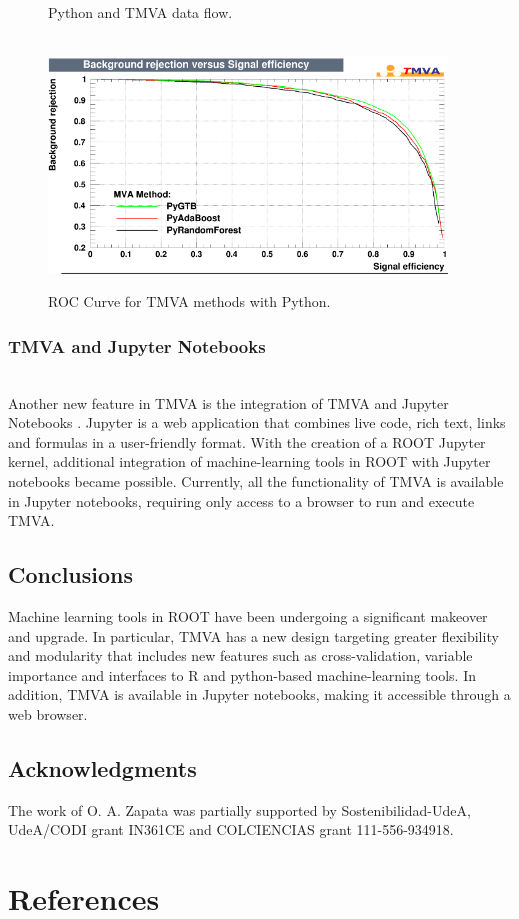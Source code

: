 \documentclass[a4paper]{jpconf}
\begin{document}
\begin{figure}[h]
\begin{minipage}{15pc}
\vspace{6pc}%
\caption{\label{pymvadf}Python and TMVA data flow.                                 }
\end{minipage}\hspace{2pc}%
\vspace{2pc}
\hspace*{\fill} \\
\includegraphics[width=25pc]{img/pymvaroc.png}\caption{\label{pymvaroc} ROC Curve for TMVA methods with Python.}
\end{figure}


\subsubsection{TMVA and Jupyter Notebooks}\hspace*{\fill} \\
Another new feature in TMVA is the integration of TMVA and Jupyter Notebooks \cite{PER-GRA:2007}. Jupyter is a web application that combines live code, rich text, links and formulas in a user-friendly format. With the creation of a ROOT Jupyter kernel, additional integration of machine-learning tools in ROOT with Jupyter notebooks became possible. Currently, all the functionality of TMVA is available in Jupyter notebooks, requiring only access to a browser to run and execute TMVA.



\subsection{Conclusions}
Machine learning tools in ROOT have been undergoing a significant makeover and upgrade. In particular, TMVA has a new design targeting greater flexibility and modularity that includes new features such as cross-validation, variable importance and interfaces to R and python-based machine-learning tools. In addition, TMVA is available in Jupyter notebooks, making it accessible through a web browser.



\subsection{Acknowledgments}
The work of O. A. Zapata was partially supported by Sostenibilidad-UdeA, UdeA/CODI grant IN361CE and COLCIENCIAS grant 111-556-934918.\newline


\section*{References}


\end{document}
